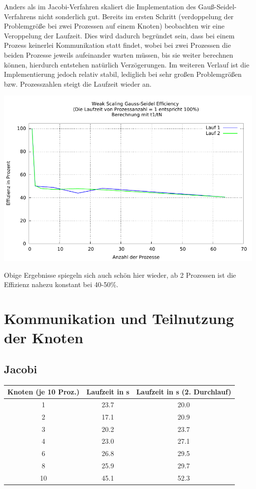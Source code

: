 \documentclass[a4paper]{article}
\begin{document}
Anders als im Jacobi-Verfahren skaliert die Implementation des Gauß-Seidel-Verfahrens nicht sonderlich gut. Bereits im ersten Schritt (verdoppelung der Problemgröße bei zwei Prozessen auf einem Knoten) beobachten wir eine Veroppelung der Laufzeit. Dies wird dadurch begründet sein, dass bei einem Prozess keinerlei Kommunikation statt findet, wobei bei zwei Prozessen die beiden Prozesse jeweils aufeinander warten müssen, bis sie weiter berechnen können, hierdurch entstehen natürlich Verzögerungen. Im weiteren Verlauf ist die Implementierung jedoch relativ stabil, lediglich bei sehr großen Problemgrößen bzw. Prozesszahlen steigt die Laufzeit wieder an.

\includegraphics[scale=0.8]{img/WEAK_SCALING_GS_efficiency.pdf}

Obige Ergebnisse spiegeln sich auch schön hier wieder, ab 2 Prozessen ist die Effizienz nahezu konstant bei 40-50\%.

\section{Kommunikation und Teilnutzung der Knoten}
\subsection{Jacobi}
\begin{tabular}{|c|c|c|}
\hline 
Knoten (je 10 Proz.) & Laufzeit in s & Laufzeit in s (2. Durchlauf) \\ 
\hline 
1 & 23.7 & 20.0 \\ 
\hline 
2 & 17.1 & 20.9 \\ 
\hline 
3 & 20.2 & 23.7 \\ 
\hline 
4 & 23.0 & 27.1 \\ 
\hline 
6 & 26.8 & 29.5 \\ 
\hline 
8 & 25.9 & 29.7 \\ 
\hline 
10 & 45.1 & 52.3 \\ 
\hline 
\end{tabular} 
\end{document}
